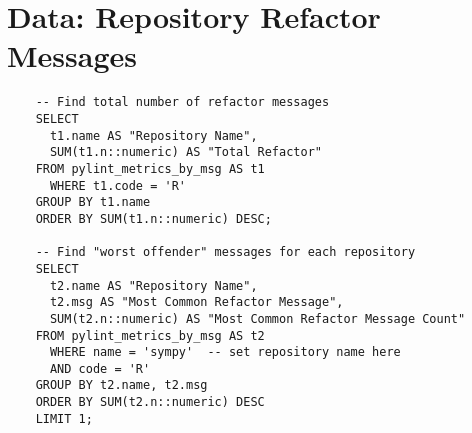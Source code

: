 \section{Data: Repository Refactor Messages} \label{appendixRefactorCounts}

\begin{singlespace}
  \begin{verbatim}
    -- Find total number of refactor messages
    SELECT 
      t1.name AS "Repository Name",
      SUM(t1.n::numeric) AS "Total Refactor"
    FROM pylint_metrics_by_msg AS t1
      WHERE t1.code = 'R'
    GROUP BY t1.name
    ORDER BY SUM(t1.n::numeric) DESC;

    -- Find "worst offender" messages for each repository
    SELECT
      t2.name AS "Repository Name",
      t2.msg AS "Most Common Refactor Message",
      SUM(t2.n::numeric) AS "Most Common Refactor Message Count"
    FROM pylint_metrics_by_msg AS t2
      WHERE name = 'sympy'  -- set repository name here
      AND code = 'R'
    GROUP BY t2.name, t2.msg
    ORDER BY SUM(t2.n::numeric) DESC
    LIMIT 1;
  \end{verbatim}
\end{singlespace}

